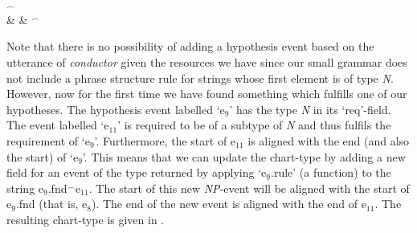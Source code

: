 \begin{ex}
{{{                                                  \\
                                                  \\
                                                  }$^{\frown}$\\
& & \hspace{2em}$^{\frown}$}}  
\end{ex}     
Note that there is no possibility of adding a hypothesis event based
on the utterance of \textit{conductor} given the resources we have
since our small grammar does not include a phrase structure rule for
strings whose first element is of type \textit{N}.  However, now for
the first time we have found something which fulfills one of our
hypotheses.  The hypothesis event labelled `e$_9$' has the type
\textit{N} in its `req'-field.  The event labelled `e$_{11}$' is
required to be of a subtype of \textit{N} and thus fulfils the
requirement of `e$_9$'.  Furthermore, the start of e$_{11}$ is aligned
with the end (and also the start) of `e$_9$'.  This means that we can
update the chart-type by adding a new field for an event of the type
returned by applying `e$_9$.rule' (a function) to the string
e$_9$.fnd$^{\frown}$e$_{11}$.  The start of this new \textit{NP}-event
will be aligned with the start of e$_9$.fnd (that is, e$_8$).  The end
of the new event is aligned with the end of e$_{11}$.  The resulting
chart-type is given in \nexteg{}.
